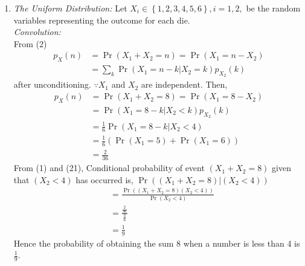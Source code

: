 \documentclass[10pt,twocolumn]{article}
\providecommand{\pr}[1]{\ensuremath{\Pr\left(#1\right)}}
\providecommand{\brak}[1]{\ensuremath{\left(#1\right)}}
\providecommand{\cbrak}[1]{\ensuremath{\left\{#1\right\}}}
\begin{document}
\begin{enumerate}
\item  {\em The Uniform Distribution: }Let $X_i \in \cbrak{1,2,3,4,5,6}, i = 1,2,$ be the random variables representing the outcome for each die. \\
{\em Convolution: } \\
From (2)
\begin{align}
p_X(n) &= \pr{X_1 + X_2 = n} = \pr{X_1  = n -X_2} \\
&= \sum_{k}^{}\pr{X_1  = n -k | X_2 = k}p_{X_2}(k)
\end{align}
after unconditioning. $\because X_1$ and $X_2$ are independent.
Then,
\begin{align}
p_X(n) &= \pr{X_1 + X_2 = 8} = \pr{X_1  = 8 -X_2} \\
&= \pr{X_1  = 8 -k | X_2 < k}p_{X_2}(k) \\
&= \frac{1}{6} \pr{X_1  = 8 -k | X_2 < 4} \\
&= \frac{1}{6} (\pr{X_1 = 5} + \pr{X_1 = 6}) \\
&= \frac{2}{36}
\end{align}
From (1) and (21), Conditional probability of event $(X_1 + X_2 = 8)$ given that $(X_2 < 4)$ has occurred is,
$\Pr{\brak{\brak{X_1 + X_2 = 8}|\brak{X_2<4}}}$ 
\begin{align}
&= \frac{\Pr{((X_1 + X_2 = 8)(X_2 < 4))}}{\Pr{\brak{X_2 < 4}}} \\
&= \frac{\frac{2}{36}}{\frac{3}{6}}\\
&= \frac{1}{9}
\end{align} 
Hence the probability of obtaining the sum 8 when a number is less than 4 is $\frac{1}{9}$. 

\end{enumerate}
\end{document}
